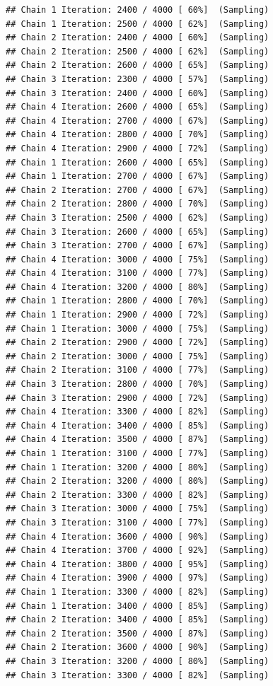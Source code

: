 \documentclass[
]{article}
\begin{document}
\begin{verbatim}
## Chain 1 Iteration: 2400 / 4000 [ 60%]  (Sampling) 
## Chain 1 Iteration: 2500 / 4000 [ 62%]  (Sampling) 
## Chain 2 Iteration: 2400 / 4000 [ 60%]  (Sampling) 
## Chain 2 Iteration: 2500 / 4000 [ 62%]  (Sampling) 
## Chain 2 Iteration: 2600 / 4000 [ 65%]  (Sampling) 
## Chain 3 Iteration: 2300 / 4000 [ 57%]  (Sampling) 
## Chain 3 Iteration: 2400 / 4000 [ 60%]  (Sampling) 
## Chain 4 Iteration: 2600 / 4000 [ 65%]  (Sampling) 
## Chain 4 Iteration: 2700 / 4000 [ 67%]  (Sampling) 
## Chain 4 Iteration: 2800 / 4000 [ 70%]  (Sampling) 
## Chain 4 Iteration: 2900 / 4000 [ 72%]  (Sampling) 
## Chain 1 Iteration: 2600 / 4000 [ 65%]  (Sampling) 
## Chain 1 Iteration: 2700 / 4000 [ 67%]  (Sampling) 
## Chain 2 Iteration: 2700 / 4000 [ 67%]  (Sampling) 
## Chain 2 Iteration: 2800 / 4000 [ 70%]  (Sampling) 
## Chain 3 Iteration: 2500 / 4000 [ 62%]  (Sampling) 
## Chain 3 Iteration: 2600 / 4000 [ 65%]  (Sampling) 
## Chain 3 Iteration: 2700 / 4000 [ 67%]  (Sampling) 
## Chain 4 Iteration: 3000 / 4000 [ 75%]  (Sampling) 
## Chain 4 Iteration: 3100 / 4000 [ 77%]  (Sampling) 
## Chain 4 Iteration: 3200 / 4000 [ 80%]  (Sampling) 
## Chain 1 Iteration: 2800 / 4000 [ 70%]  (Sampling) 
## Chain 1 Iteration: 2900 / 4000 [ 72%]  (Sampling) 
## Chain 1 Iteration: 3000 / 4000 [ 75%]  (Sampling) 
## Chain 2 Iteration: 2900 / 4000 [ 72%]  (Sampling) 
## Chain 2 Iteration: 3000 / 4000 [ 75%]  (Sampling) 
## Chain 2 Iteration: 3100 / 4000 [ 77%]  (Sampling) 
## Chain 3 Iteration: 2800 / 4000 [ 70%]  (Sampling) 
## Chain 3 Iteration: 2900 / 4000 [ 72%]  (Sampling) 
## Chain 4 Iteration: 3300 / 4000 [ 82%]  (Sampling) 
## Chain 4 Iteration: 3400 / 4000 [ 85%]  (Sampling) 
## Chain 4 Iteration: 3500 / 4000 [ 87%]  (Sampling) 
## Chain 1 Iteration: 3100 / 4000 [ 77%]  (Sampling) 
## Chain 1 Iteration: 3200 / 4000 [ 80%]  (Sampling) 
## Chain 2 Iteration: 3200 / 4000 [ 80%]  (Sampling) 
## Chain 2 Iteration: 3300 / 4000 [ 82%]  (Sampling) 
## Chain 3 Iteration: 3000 / 4000 [ 75%]  (Sampling) 
## Chain 3 Iteration: 3100 / 4000 [ 77%]  (Sampling) 
## Chain 4 Iteration: 3600 / 4000 [ 90%]  (Sampling) 
## Chain 4 Iteration: 3700 / 4000 [ 92%]  (Sampling) 
## Chain 4 Iteration: 3800 / 4000 [ 95%]  (Sampling) 
## Chain 4 Iteration: 3900 / 4000 [ 97%]  (Sampling) 
## Chain 1 Iteration: 3300 / 4000 [ 82%]  (Sampling) 
## Chain 1 Iteration: 3400 / 4000 [ 85%]  (Sampling) 
## Chain 2 Iteration: 3400 / 4000 [ 85%]  (Sampling) 
## Chain 2 Iteration: 3500 / 4000 [ 87%]  (Sampling) 
## Chain 2 Iteration: 3600 / 4000 [ 90%]  (Sampling) 
## Chain 3 Iteration: 3200 / 4000 [ 80%]  (Sampling) 
## Chain 3 Iteration: 3300 / 4000 [ 82%]  (Sampling) 

\end{verbatim}
\end{document}
